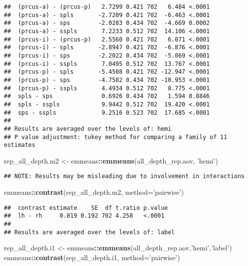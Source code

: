 \documentclass[
]{article}
\newenvironment{Shaded}{\begin{snugshade}}{\end{snugshade}}
\newcommand{\DataTypeTok}[1]{\textcolor[rgb]{0.13,0.29,0.53}{#1}}
\newcommand{\KeywordTok}[1]{\textcolor[rgb]{0.13,0.29,0.53}{\textbf{#1}}}
\newcommand{\NormalTok}[1]{#1}
\newcommand{\OperatorTok}[1]{\textcolor[rgb]{0.81,0.36,0.00}{\textbf{#1}}}
\newcommand{\StringTok}[1]{\textcolor[rgb]{0.31,0.60,0.02}{#1}}
\begin{document}
\begin{verbatim}
##  (prcus-a) - (prcus-p)   2.7299 0.421 702   6.484 <.0001 
##  (prcus-a) - spls       -2.7209 0.421 702  -6.463 <.0001 
##  (prcus-a) - sps        -2.0283 0.434 702  -4.669 0.0002 
##  (prcus-a) - sspls       7.2233 0.512 702  14.106 <.0001 
##  (prcus-i) - (prcus-p)   2.5560 0.421 702   6.071 <.0001 
##  (prcus-i) - spls       -2.8947 0.421 702  -6.876 <.0001 
##  (prcus-i) - sps        -2.2022 0.434 702  -5.069 <.0001 
##  (prcus-i) - sspls       7.0495 0.512 702  13.767 <.0001 
##  (prcus-p) - spls       -5.4508 0.421 702 -12.947 <.0001 
##  (prcus-p) - sps        -4.7582 0.434 702 -10.953 <.0001 
##  (prcus-p) - sspls       4.4934 0.512 702   8.775 <.0001 
##  spls - sps              0.6926 0.434 702   1.594 0.8846 
##  spls - sspls            9.9442 0.512 702  19.420 <.0001 
##  sps - sspls             9.2516 0.523 702  17.685 <.0001 
## 
## Results are averaged over the levels of: hemi 
## P value adjustment: tukey method for comparing a family of 11 estimates
\end{verbatim}

\begin{Shaded}
\begin{Highlighting}[]
\NormalTok{rep_all_depth.m2 <-}\StringTok{ }\NormalTok{emmeans}\OperatorTok{::}\KeywordTok{emmeans}\NormalTok{(all_depth_rep.aov, }\StringTok{'hemi'}\NormalTok{)}
\end{Highlighting}
\end{Shaded}

\begin{verbatim}
## NOTE: Results may be misleading due to involvement in interactions
\end{verbatim}

\begin{Shaded}
\begin{Highlighting}[]
\NormalTok{emmeans}\OperatorTok{::}\KeywordTok{contrast}\NormalTok{(rep_all_depth.m2, }\DataTypeTok{method=}\StringTok{'pairwise'}\NormalTok{)}
\end{Highlighting}
\end{Shaded}

\begin{verbatim}
##  contrast estimate    SE  df t.ratio p.value
##  lh - rh     0.819 0.192 702 4.258   <.0001 
## 
## Results are averaged over the levels of: label
\end{verbatim}

\begin{Shaded}
\begin{Highlighting}[]
\NormalTok{rep_all_depth.i1 <-}\StringTok{ }\NormalTok{emmeans}\OperatorTok{::}\KeywordTok{emmeans}\NormalTok{(all_depth_rep.aov,}\StringTok{'hemi'}\NormalTok{,}\StringTok{'label'}\NormalTok{)}
\NormalTok{emmeans}\OperatorTok{::}\KeywordTok{contrast}\NormalTok{(rep_all_depth.i1, }\DataTypeTok{method=}\StringTok{'pairwise'}\NormalTok{)}
\end{Highlighting}
\end{Shaded}
\end{document}
